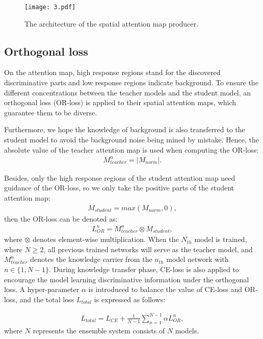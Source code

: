 \documentclass{article}
\begin{document}
\begin{figure}[!t]
\centering
\texttt{[image: 3.pdf]}
\caption{The architecture of the spatial attention map producer.}
\label{fig:photo3}
\end{figure}

\subsection{Orthogonal loss} 
On the attention map, high response regions stand for the discovered discriminative parts and low response regions indicate background. To ensure the different concentrations between the teacher models and the student model, an orthogonal loss (OR-loss) is applied to their spatial attention maps, which guarantee them to be diverse. 

Furthermore, we hope the knowledge of background is also transferred to the student model to avoid the background noise being mined by mistake. Hence, the absolute value of the teacher attention map is used when computing the OR-loss:
\begin{align}
M_{teacher}^n=\left |M_{norm}  \right |.
\end{align}

Besides, only the high response regions of the student attention map need guidance of the OR-loss, so we only take the positive parts of the student attention map:
\begin{align}
M_{student}=max(M_{norm}, 0),
\end{align}
then the OR-loss can be denoted as:
\begin{align}
L_{OR}^{n}=M_{teacher}^n\otimes M_{student},
\end{align}
where $\otimes$ denotes element-wise multiplication. When the $N_{th}$ model is trained, where $N \geq 2$, all previous trained networks will serve as the teacher model, and $M_{teacher}^n$ denotes the knowledge carrier from the $n_{th}$ model network with $n\in\{1,N-1\}$. During knowledge transfer phase, CE-loss is also applied to encourage the model learning discriminative information under the orthogonal loss. A hyper-parameter $\alpha$ is introduced to balance the value of CE-loss and OR-loss, and the total loss $L_{total}$ is expressed as follows:


\begin{align}
L_{total}=L_{CE}+ \frac{1}{N-1} \sum_{n=1}^{N-1} \alpha L_{OR}^n,
\end{align}
where $N$ represents the ensemble system consists of $N$ models.
\end{document}
